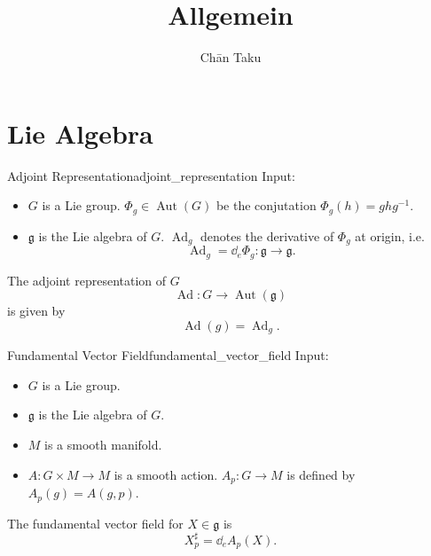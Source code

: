 \documentclass{article}
\title{Allgemein}
\author{Ch\=an Taku}
\begin{document}
\maketitle

\section{Lie Algebra}

\begin{definition}{Adjoint Representation}{adjoint_representation}
    Input:
    \begin{itemize}
        \item $G$ is a Lie group.
        $\Phi_g \in \operatorname{Aut}(G)$ be the conjutation $\Phi_g(h) = ghg^{-1}$.
        \item $\mathfrak{g}$ is the Lie algebra of $G$.
        $\operatorname{Ad}_g$ denotes the derivative of $\Phi_g$ at origin, i.e.
        \[ \operatorname{Ad}_g = \dd_e \Phi_g: \mathfrak{g} \rightarrow \mathfrak{g}. \]
    \end{itemize}
    The adjoint representation of $G$
    \[ \operatorname{Ad}: G \rightarrow \operatorname{Aut}(\mathfrak{g}) \]
    is given by
    \[ \operatorname{Ad}(g) = \operatorname{Ad}_g. \]
\end{definition}

\begin{definition}{Fundamental Vector Field}{fundamental_vector_field}
    Input:
    \begin{itemize}
        \item $G$ is a Lie group.
        \item $\mathfrak{g}$ is the Lie algebra of $G$.
        \item $M$ is a smooth manifold.
        \item $A: G\times M \rightarrow M$ is a smooth action.
        $A_p: G\rightarrow M$ is defined by $A_p(g) = A(g, p)$.
    \end{itemize}
    The fundamental vector field for $X\in \mathfrak{g}$ is
    \[ X^\sharp_p = \dd_e A_p(X). \]
\end{definition}

% 
% 
\end{document}
